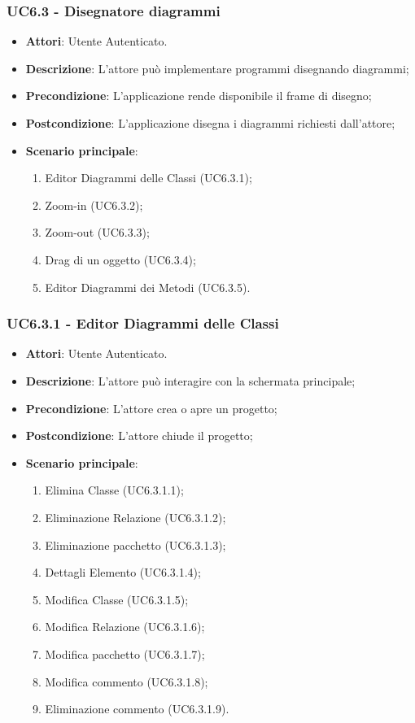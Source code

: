 \subsubsection{UC6.3 - Disegnatore diagrammi} 
\label{sssec:UC6.3} 
\begin{itemize} 
\item \textbf{Attori}: Utente Autenticato.
\item \textbf{Descrizione}: L'attore può implementare programmi disegnando diagrammi;
\item \textbf{Precondizione}: L'applicazione rende disponibile il frame di disegno;
\item \textbf{Postcondizione}: L'applicazione disegna i diagrammi richiesti dall'attore;
\item \textbf{Scenario principale}: \begin{enumerate}\item Editor Diagrammi delle Classi (UC6.3.1);\item Zoom-in (UC6.3.2);\item Zoom-out (UC6.3.3);\item Drag di un oggetto (UC6.3.4);\item Editor Diagrammi dei Metodi (UC6.3.5). 
 \end{enumerate}
\end{itemize} 
\subsubsection{UC6.3.1 - Editor Diagrammi delle Classi} 
\label{sssec:UC6.3.1} 
\begin{itemize} 
\item \textbf{Attori}: Utente Autenticato.
\item \textbf{Descrizione}: L'attore può interagire con la schermata principale;
\item \textbf{Precondizione}: L'attore crea o apre un progetto;
\item \textbf{Postcondizione}: L'attore chiude il progetto;
\item \textbf{Scenario principale}: \begin{enumerate}\item Elimina Classe (UC6.3.1.1);\item Eliminazione Relazione (UC6.3.1.2);\item Eliminazione pacchetto (UC6.3.1.3);\item Dettagli Elemento (UC6.3.1.4);\item Modifica Classe (UC6.3.1.5);\item Modifica Relazione (UC6.3.1.6);\item Modifica pacchetto (UC6.3.1.7);\item Modifica commento (UC6.3.1.8);\item Eliminazione commento (UC6.3.1.9). 
 \end{enumerate}
\end{itemize} 
